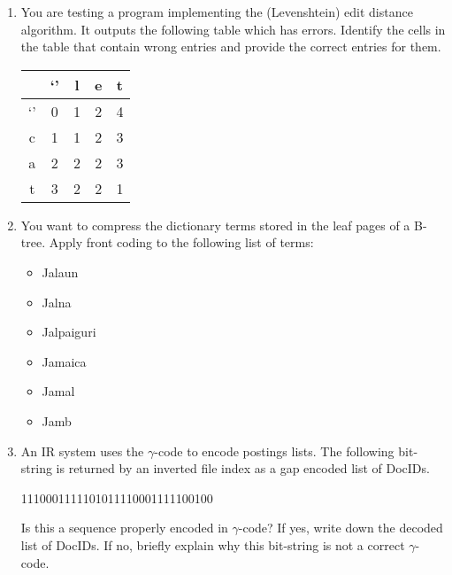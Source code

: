 \documentclass[12pt]{article}
\newcommand{\answer}[1]{\fbox{\parbox{\linewidth}{#1}}}
\begin{document}
\begin{enumerate}[itemsep=3em]
		\newpage
		\item{
			You are testing a program implementing the (Levenshtein) edit distance algorithm. It outputs the following table which has errors. Identify the cells in the table that contain wrong entries and provide the correct entries for them. \\		
				\begin{center}
					\begin{tabular}{| c | c | c | c | c |}
						\hline
						& `' & l & e & t \\
						\hline
						`' & 0 & 1 & 2 & 4 \\
						\hline
						c & 1 & 1 & 2 & 3 \\
						\hline
						a & 2 & 2 & 2 & 3 \\
						\hline
						t & 3 & 2 & 2 & 1 \\
						\hline 
					\end{tabular}
				\end{center}			
				
			\answer{}
		}
		
		\item{
			You want to compress the dictionary terms stored in the leaf pages of a B-tree. Apply front coding to the following list of terms:
			\begin{itemize}
				\item{Jalaun}
				\item{Jalna}
				\item{Jalpaiguri}
				\item{Jamaica}
				\item{Jamal}
				\item{Jamb}
			\end{itemize}
			
			\answer{}
		}

		\newpage
		\item{
			An IR system uses the $\gamma$-code to encode postings lists. The following bit-string is returned by an inverted file index as a gap encoded list of DocIDs.
			\begin{center}
				1110001111101011110001111100100
			\end{center}
			Is this a sequence properly encoded in $\gamma$-code? If yes, write down the decoded list of DocIDs. If no, briefly explain why this bit-string is not a correct $\gamma$-code.\\ \\
			
			\answer{}
		}
		

\end{enumerate}
\end{document}
